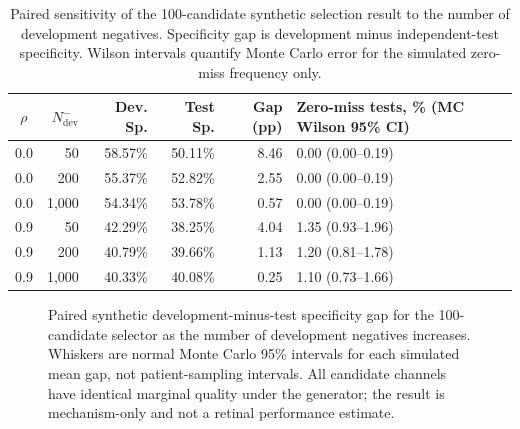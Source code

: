\documentclass[11pt]{article}
\begin{document}
\begin{table}[t]
\centering
\caption{Paired sensitivity of the 100-candidate synthetic selection result to the number of development negatives. Specificity gap is development minus independent-test specificity. Wilson intervals quantify Monte Carlo error for the simulated zero-miss frequency only.}
\label{tab:arxiv-negative-sample-sensitivity}
\footnotesize
\begin{tabularx}{\textwidth}{c r r r r X}
\toprule
$\rho$ & $N^-_{\mathrm{dev}}$ & Dev. Sp. & Test Sp. & Gap (pp) & Zero-miss tests, \% (MC Wilson 95\% CI) \\
\midrule
0.0 & 50 & 58.57\% & 50.11\% & 8.46 & 0.00 (0.00--0.19) \\
0.0 & 200 & 55.37\% & 52.82\% & 2.55 & 0.00 (0.00--0.19) \\
0.0 & 1,000 & 54.34\% & 53.78\% & 0.57 & 0.00 (0.00--0.19) \\
0.9 & 50 & 42.29\% & 38.25\% & 4.04 & 1.35 (0.93--1.96) \\
0.9 & 200 & 40.79\% & 39.66\% & 1.13 & 1.20 (0.81--1.78) \\
0.9 & 1,000 & 40.33\% & 40.08\% & 0.25 & 1.10 (0.73--1.66) \\
\bottomrule
\end{tabularx}
\end{table}

\begin{figure}[t]
\centering
{}
\caption{Paired synthetic development-minus-test specificity gap for the 100-candidate selector as the number of development negatives increases. Whiskers are normal Monte Carlo 95\% intervals for each simulated mean gap, not patient-sampling intervals. All candidate channels have identical marginal quality under the generator; the result is mechanism-only and not a retinal performance estimate.}
\label{fig:arxiv-negative-sample-sensitivity}
\end{figure}
\end{document}
